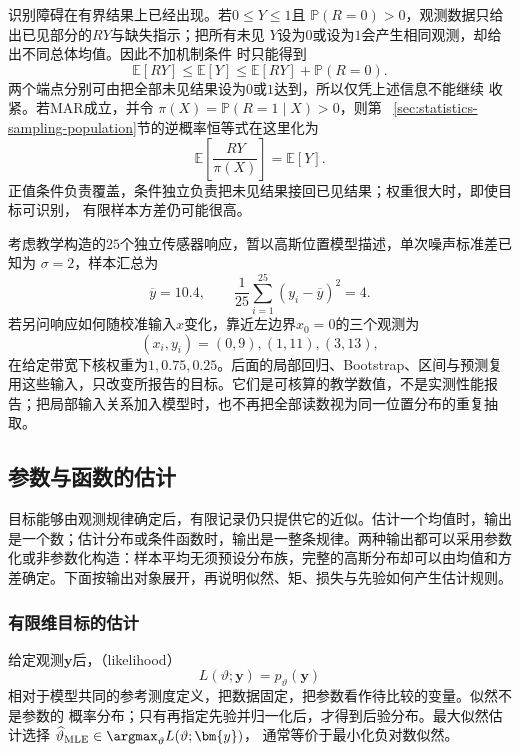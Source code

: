 识别障碍在有界结果上已经出现。若\(0\leq Y\leq1\)且
\(\mathbb{P}(R=0)>0\)，观测数据只给出已见部分的\(RY\)与缺失指示；把所有未见
\(Y\)设为\(0\)或设为\(1\)会产生相同观测，却给出不同总体均值。因此不加机制条件
时只能得到
\[
  \mathbb{E}[RY]
  \leq\mathbb{E}[Y]
  \leq\mathbb{E}[RY]+\mathbb{P}(R=0).
\]
两个端点分别可由把全部未见结果设为\(0\)或\(1\)达到，所以仅凭上述信息不能继续
收紧。若MAR成立，并令
\(\pi(X)=\mathbb{P}(R=1\mid X)>0\)，则第
~\ref{sec:statistics-sampling-population}节的逆概率恒等式在这里化为
\[
  \mathbb{E}\left[\frac{RY}{\pi(X)}\right]
  =\mathbb{E}[Y].
\]
正值条件负责覆盖，条件独立负责把未见结果接回已见结果；权重很大时，即使目标可识别，
有限样本方差仍可能很高。
\begin{example}[贯穿本章的传感器校准数据]
\label{ex:statistics-running-sensor-calibration}
考虑教学构造的\(25\)个独立传感器响应，暂以高斯位置模型描述，单次噪声标准差已知为
\(\sigma=2\)，样本汇总为
\[
\overline y=10.4,\qquad
\frac1{25}\sum_{i=1}^{25}(y_i-\overline y)^2=4.
\]
若另问响应如何随校准输入\(x\)变化，靠近左边界\(x_0=0\)的三个观测为
\[
(x_i,y_i)=(0,9),(1,11),(3,13),
\]
在给定带宽下核权重为\(1,0.75,0.25\)。后面的局部回归、Bootstrap、区间与预测复用这些输入，只改变所报告的目标。它们是可核算的教学数值，不是实测性能报告；把局部输入关系加入模型时，也不再把全部读数视为同一位置分布的重复抽取。
\end{example}

\subsection{参数与函数的估计}
\label{sec:stats-parameter-inference-efficiency}
目标能够由观测规律确定后，有限记录仍只提供它的近似。估计一个均值时，输出是一个数；估计分布或条件函数时，输出是一整条规律。两种输出都可以采用参数化或非参数化构造：样本平均无须预设分布族，完整的高斯分布却可以由均值和方差确定。下面按输出对象展开，再说明似然、矩、损失与先验如何产生估计规则。

\subsubsection{有限维目标的估计}
\label{sec:statistics-likelihood-robustness}
\label{sec:statistics-bayes-hierarchy}
给定观测\(\bm{y}\)后，（likelihood）
\[
  L(\vartheta;\bm{y})=p_\vartheta(\bm{y})
\]
相对于模型共同的参考测度定义，把数据固定，把参数看作待比较的变量。似然不是参数的
概率分布；只有再指定先验并归一化后，才得到后验分布。最大似然估计选择
\(\widehat\vartheta_{\mathrm{MLE}}\in\argmax_\vartheta L(\vartheta;\bm{y})\)，
通常等价于最小化负对数似然。

